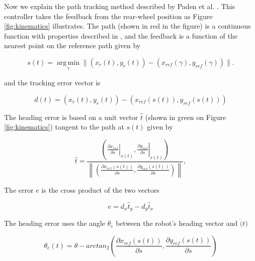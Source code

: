 \documentclass[symmetry,article,submit,moreauthors,pdftex]{Definitions/mdpi}
\begin{document}
Now we explain the path tracking method described by Paden et al.
\cite{paden_survey_2016}.  This controller takes the feedback from the
rear-wheel position as Figure \ref{fig:kinematics} illustrates.  The path
(shown in red in the figure) is a continuous function with properties
described in \cite{samson1992path}, and the feedback is a function of the
nearest point on the reference path given by 

\begin{equation}\label{eq:gamma}
s(t) = \operatorname*{arg\,min}_{\gamma} \|(x_r(t),y_r(t)) - (x_{ref}(\gamma),y_{ref}(\gamma)) \|.
\end{equation}

and the tracking error vector is 

\begin{equation}\label{eq:tracking_error}
d(t) = (x_r(t),y_r(t))-(x_{ref}(s(t)),y_{ref}(s(t)))
\end{equation}

The heading error is based on a unit vector $\hat{t}$ (shown in green on Figure
\ref{fig:kinematics}) tangent to the path at $s(t)$ given by 

\begin{equation}
\hat{t} = \frac{ \left(\left.\frac{\partial x_{ref}}{\partial s} \right|_{s(t)},\left.\frac{\partial y_{ref}}{\partial s} \right|_{s(t)}\right)} 
              {\left\| \left(\frac{\partial x_{ref}(s(t))}{\partial s},\frac{\partial y_{ref}(s(t))}{\partial s}\right) \right\|},
\end{equation}

The error $e$ is the cross product of the two vectors

\begin{equation}
e = d_x \hat{t}_y - d_y \hat{t}_x
\end{equation}

The heading error uses the angle $\theta_e$ between the robot's heading vector
and $\dot(t)$

\begin{equation}
\theta_e(t) = \theta - arctan_2 \left( \frac{\partial x_{ref}(s(t))}{\partial s} , \frac{\partial y_{ref}(s(t))}{\partial s} \right)
\end{equation}




\end{document}
